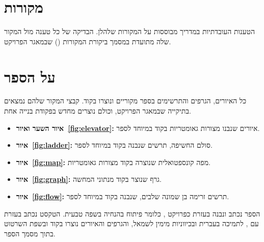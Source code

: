 \chapter*{מקורות}
\thispagestyle{plain}

הטענות העובדתיות במדריך מבוססות על המקורות שלהלן. הבדיקה של כל טענה מול המקור שלה מתועדת
במסמך ביקורת המקורות () שבמאגר הפרויקט.

\begin{english}
\printbibliography[heading=none]
\end{english}
\clearpage

\chapter*{על הספר}
\thispagestyle{plain}

כל האיורים, הגרפים והתרשימים בספר מקוריים ונוצרו בקוד. קבצי המקור שלהם נמצאים בתיקייה 
שבמאגר הפרויקט, וכולם נוצרים מחדש בפקודת בנייה אחת.
\begin{itemize}
  \item \textbf{איור השער ואיור~\ref{fig:elevator}:} איורים שנבנו מצורות גאומטריות בקוד  במיוחד לספר.
  \item \textbf{איור~\ref{fig:ladder}:} סולם החשיפה, תרשים שנבנה בקוד  במיוחד לספר.
  \item \textbf{איור~\ref{fig:map}:} מפה קונספטואלית שנוצרה בקוד  מצורות גאומטריות.
  \item \textbf{איור~\ref{fig:graph}:} גרף שנוצר בקוד  מנתוני המחשה.
  \item \textbf{איור~\ref{fig:flow}:} תרשים זרימה בן שמונה שלבים, שנבנה בקוד  במיוחד לספר.
\end{itemize}

הספר נכתב ונבנה בעזרת  כפרויקט , כלומר פיתוח בהנחיה בשפה טבעית.
הטקסט נכתב בעזרת  עם , לתמיכה בעברית ובכיווניות מימין לשמאל, והגרפים
והאיורים נוצרו בקוד  ובשפת השרטוט  בתוך מסמך הספר.

